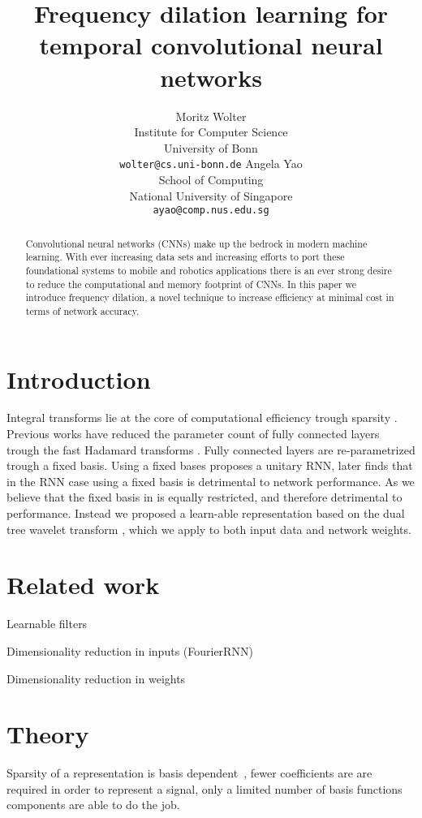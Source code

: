 \documentclass{article}
\title{Frequency dilation learning for temporal convolutional neural networks}
\author{Moritz Wolter\\
 Institute for Computer Science\\
 University of Bonn\\
 {\tt\small wolter@cs.uni-bonn.de}
 \And
 Angela Yao\\
 School of Computing\\
 National University of Singapore\\
 {\tt\small ayao@comp.nus.edu.sg}
}
\begin{document}
\maketitle

\begin{abstract}
Convolutional neural networks (CNNs) make up the bedrock in modern machine learning. With ever increasing data sets and increasing efforts to port these foundational systems to mobile and robotics applications there is an ever strong desire to reduce the computational and memory footprint of CNNs. In this paper we introduce frequency dilation, a novel technique to increase efficiency at minimal cost in terms of network accuracy.
\end{abstract}

\section{Introduction}
Integral transforms lie at the core of computational efficiency trough sparsity \cite{Mallat}\cite{Strang1997}. Previous works have reduced the parameter count of fully connected layers trough the fast Hadamard transforms \cite{yang2015deep}. Fully connected layers are re-parametrized trough a fixed basis. Using a fixed bases \cite{Arjovsky2016} proposes a unitary RNN, later \cite{Wisdom2016} finds that in the RNN case using a fixed basis is detrimental to network performance. 
As we believe that the fixed basis in \cite{yang2015deep} is equally restricted, and therefore detrimental to performance. Instead we proposed a learn-able representation based on the dual tree wavelet transform \cite{Selesnick2005}, which we apply to both input data and network weights. 

\section{Related work}
Learnable filters \cite{Recoskie2018}

Dimensionality reduction in inputs (FourierRNN)

Dimensionality reduction in weights \cite{yang2015deep}

\section{Theory}
Sparsity of a representation is basis dependent~\cite{Strang1997}\cite{Strang1994}, fewer coefficients are are required in order to represent a signal, only a limited number of basis functions components are able to do the job.
\end{document}

